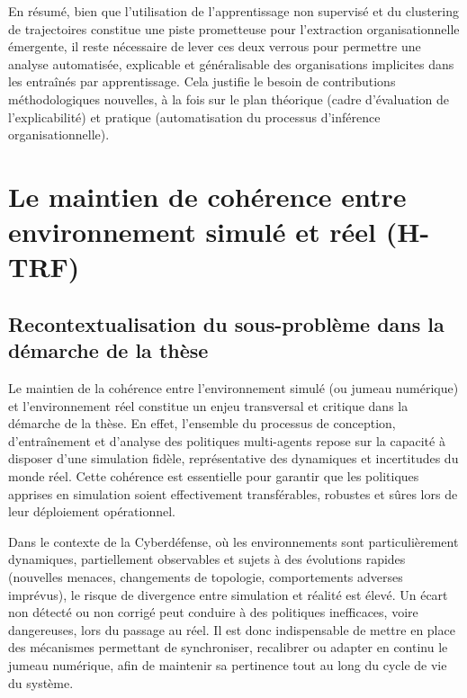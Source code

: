 En résumé, bien que l'utilisation de l'apprentissage non supervisé et du clustering de trajectoires constitue une piste prometteuse pour l'extraction organisationnelle émergente, il reste nécessaire de lever ces deux verrous pour permettre une analyse automatisée, explicable et généralisable des organisations implicites dans les  entraînés par apprentissage. Cela justifie le besoin de contributions méthodologiques nouvelles, à la fois sur le plan théorique (cadre d'évaluation de l'explicabilité) et pratique (automatisation du processus d'inférence organisationnelle).



\section{Le maintien de cohérence entre environnement simulé et réel (H-TRF)}

\subsection*{Recontextualisation du sous-problème dans la démarche de la thèse}

Le maintien de la cohérence entre l'environnement simulé (ou jumeau numérique) et l'environnement réel constitue un enjeu transversal et critique dans la démarche de la thèse. En effet, l'ensemble du processus de conception, d'entraînement et d'analyse des politiques multi-agents repose sur la capacité à disposer d'une simulation fidèle, représentative des dynamiques et incertitudes du monde réel. Cette cohérence est essentielle pour garantir que les politiques apprises en simulation soient effectivement transférables, robustes et sûres lors de leur déploiement opérationnel.

Dans le contexte de la Cyberdéfense, où les environnements sont particulièrement dynamiques, partiellement observables et sujets à des évolutions rapides (nouvelles menaces, changements de topologie, comportements adverses imprévus), le risque de divergence entre simulation et réalité est élevé. Un écart non détecté ou non corrigé peut conduire à des politiques inefficaces, voire dangereuses, lors du passage au réel. Il est donc indispensable de mettre en place des mécanismes permettant de synchroniser, recalibrer ou adapter en continu le jumeau numérique, afin de maintenir sa pertinence tout au long du cycle de vie du système.

